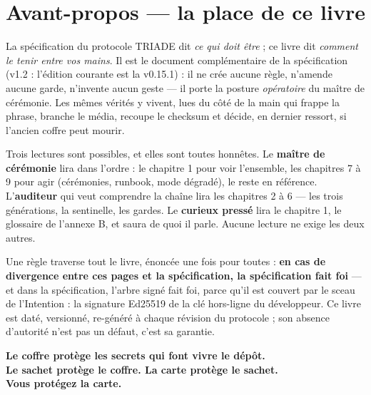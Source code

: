 \section*{Avant-propos — la place de ce livre}\label{sec:avantpropos}


La spécification du protocole TRIADE dit \emph{ce qui doit être} ; ce livre dit
\emph{comment le tenir entre vos mains}. Il est le document complémentaire de la
spécification (v1.2 : l'édition courante est la v0.15.1) : il ne crée aucune règle,
n'amende aucune garde, n'invente aucun geste
— il porte la posture \emph{opératoire} du maître de cérémonie. Les mêmes vérités y
vivent, lues du côté de la main qui frappe la phrase, branche le média, recoupe le
checksum et décide, en dernier ressort, si l'ancien coffre peut mourir.

Trois lectures sont possibles, et elles sont toutes honnêtes. Le \textbf{maître de
cérémonie} lira dans l'ordre : le chapitre 1 pour voir l'ensemble, les chapitres 7 à 9
pour agir (cérémonies, runbook, mode dégradé), le reste en référence. L'\textbf{auditeur}
qui veut comprendre la chaîne lira les chapitres 2 à 6 — les trois générations, la
sentinelle, les gardes. Le \textbf{curieux pressé} lira le chapitre 1, le glossaire de
l'annexe B, et saura de quoi il parle. Aucune lecture ne exige les deux autres.

Une règle traverse tout le livre, énoncée une fois pour toutes : \textbf{en cas de
divergence entre ces pages et la spécification, la spécification fait foi} — et dans la
spécification, l'arbre signé  fait foi, parce qu'il est couvert par le
sceau de l'Intention : la signature Ed25519 de la clé hors-ligne du développeur. Ce
livre est daté, versionné, re-généré à chaque révision du protocole ; son absence
d'autorité n'est pas un défaut, c'est sa garantie.

\bigskip

\begin{center}
\large\bfseries Le coffre protège les secrets qui font vivre le dépôt.\\
Le sachet protège le coffre. La carte protège le sachet.\\
Vous protégez la carte.
\end{center}

